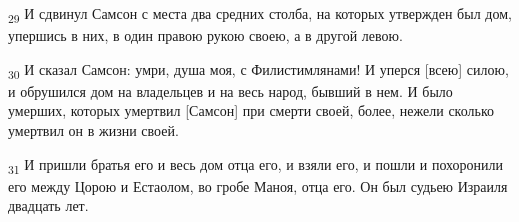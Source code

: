 \begin{tcolorbox}
\textsubscript{29} И сдвинул Самсон с места два средних столба, на которых утвержден был дом, упершись в них, в один правою рукою своею, а в другой левою.
\end{tcolorbox}
\begin{tcolorbox}
\textsubscript{30} И сказал Самсон: умри, душа моя, с Филистимлянами! И уперся [всею] силою, и обрушился дом на владельцев и на весь народ, бывший в нем. И было умерших, которых умертвил [Самсон] при смерти своей, более, нежели сколько умертвил он в жизни своей.
\end{tcolorbox}
\begin{tcolorbox}
\textsubscript{31} И пришли братья его и весь дом отца его, и взяли его, и пошли и похоронили его между Цорою и Естаолом, во гробе Маноя, отца его. Он был судьею Израиля двадцать лет.
\end{tcolorbox}
